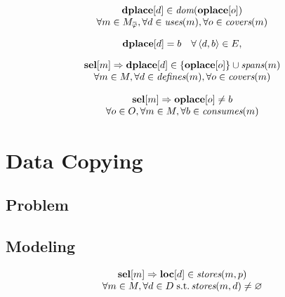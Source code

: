 \begin{equation}
  \begin{array}{c}
    \mVar{dplace}[d] \in \mDom(\mVar{oplace}[o]) \\
    \forall m \in \mMatchCompSet{\mPhi},
    \forall d \in \mUses(m),
    \forall o \in \mCovers(m)
  \end{array}
  \labelEquation{dom}
\end{equation}

\begin{equation}
  \mVar{dplace}[d] = b
  \mQuantSep
  \forall \mUnDirEdge{d}{b} \in \mDefEdgeSet,
  \labelEquation{def-edges}
\end{equation}

\begin{equation}
  \begin{array}{c}
    \mVar{sel}[m]
    \mImp
    \mVar{dplace}[d] \in \mSet{\mVar{oplace}[o]} \cup \mSpans(m) \\
    \forall m \in \mMatchSet,
    \forall d \in \mDefines(m),
    \forall o \in \mCovers(m)
  \end{array}
  \labelEquation{spanning}
\end{equation}

\begin{equation}
  \begin{array}{c}
    \mVar{sel}[m]
    \mImp
    \mVar{oplace}[o] \neq b \\
    \forall o \in \mOpSet,
    \forall m \in \mMatchSet,
    \forall b \in \mConsumes(m)
  \end{array}
  \labelEquation{consumption}
\end{equation}



\section{Data Copying}
\subsection{Problem}
\subsection{Modeling}

\begin{equation}
  \begin{array}{c}
    \mVar{sel}[m]
    \mImp
    \mVar{loc}[d] \in \mStores(m, p) \\
    \forall m \in \mMatchSet,
    \forall d \in \mDataSet \;\text{s.t.} \mStores(m, d) \neq \mEmptySet
  \end{array}
  \labelEquation{valid-locations}
\end{equation}

